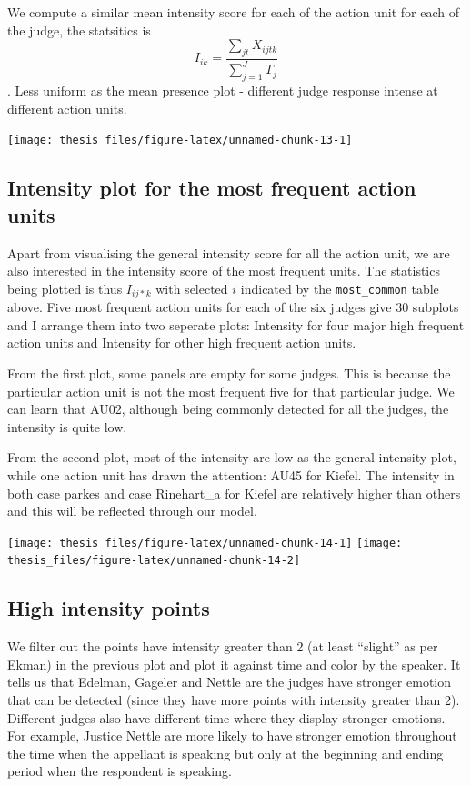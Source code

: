 \documentclass{monashthesis}
\begin{document}
We compute a similar mean intensity score for each of the action unit for each of the judge, the statsitics is \[I_{ik} = \frac{\sum_{jt}X_{ijtk}}{\sum_{j = 1}^JT_j}\]. Less uniform as the mean presence plot - different judge response intense at different action units.

\texttt{[image: thesis\_files/figure-latex/unnamed-chunk-13-1]}

\hypertarget{intensity-plot-for-the-most-frequent-action-units}{%
\subsection{Intensity plot for the most frequent action units}\label{intensity-plot-for-the-most-frequent-action-units}}

Apart from visualising the general intensity score for all the action unit, we are also interested in the intensity score of the most frequent units. The statistics being plotted is thus \(I_{ij*k}\) with selected \(i\) indicated by the \texttt{most\_common} table above. Five most frequent action units for each of the six judges give 30 subplots and I arrange them into two seperate plots: Intensity for four major high frequent action units and Intensity for other high frequent action units.

From the first plot, some panels are empty for some judges. This is because the particular action unit is not the most frequent five for that particular judge. We can learn that AU02, although being commonly detected for all the judges, the intensity is quite low.

From the second plot, most of the intensity are low as the general intensity plot, while one action unit has drawn the attention: AU45 for Kiefel. The intensity in both case parkes and case Rinehart\_a for Kiefel are relatively higher than others and this will be reflected through our model.

\texttt{[image: thesis\_files/figure-latex/unnamed-chunk-14-1]}
\texttt{[image: thesis\_files/figure-latex/unnamed-chunk-14-2]}

\hypertarget{high-intensity-points}{%
\subsection{High intensity points}\label{high-intensity-points}}

We filter out the points have intensity greater than 2 (at least ``slight'' as per Ekman) in the previous plot and plot it against time and color by the speaker. It tells us that Edelman, Gageler and Nettle are the judges have stronger emotion that can be detected (since they have more points with intensity greater than 2). Different judges also have different time where they display stronger emotions. For example, Justice Nettle are more likely to have stronger emotion throughout the time when the appellant is speaking but only at the beginning and ending period when the respondent is speaking.
\end{document}
